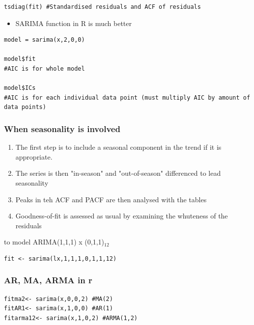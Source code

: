 \documentclass{article}
\begin{document}
\begin{lstlisting}
tsdiag(fit) #Standardised residuals and ACF of residuals
\end{lstlisting}


\begin{itemize}
    \item SARIMA function in R is much better
\end{itemize}

\begin{lstlisting}
model = sarima(x,2,0,0)

model$fit
#AIC is for whole model

model$ICs
#AIC is for each individual data point (must multiply AIC by amount of data points)
\end{lstlisting}

\subsubsection{When seasonality is involved}

\begin{enumerate}
    \item The first step is to include a seasonal component in the trend if it is appropriate.
    \item The series is then "in-season" and "out-of-season" differenced to lead seasonality
    \item Peaks in teh ACF and PACF are then analysed with the tables
    \item Goodness-of-fit is assessed as usual by examining the whuteness of the residuals
\end{enumerate}

\vspace{1cm}

\noindent to model ARIMA(1,1,1) x (0,1,1)$_{12}$
\begin{lstlisting}
fit <- sarima(lx,1,1,1,0,1,1,12)
\end{lstlisting}


\subsubsection{AR, MA, ARMA in r}

\begin{lstlisting}
fitma2<- sarima(x,0,0,2) #MA(2)
fitAR1<- sarima(x,1,0,0) #AR(1)
fitarma12<- sarima(x,1,0,2) #ARMA(1,2)
\end{lstlisting}
\end{document}
